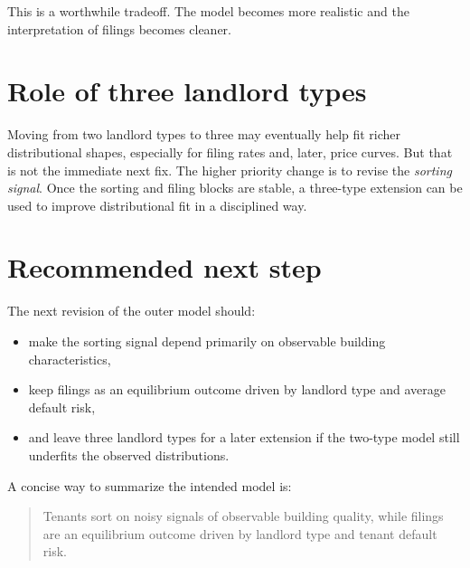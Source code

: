 \documentclass[11pt]{article}
\begin{document}
This is a worthwhile tradeoff. The model becomes more realistic and the interpretation of filings becomes cleaner.

\section{Role of three landlord types}
Moving from two landlord types to three may eventually help fit richer distributional shapes, especially for filing rates and, later, price curves. But that is not the immediate next fix. The higher priority change is to revise the \emph{sorting signal}. Once the sorting and filing blocks are stable, a three-type extension can be used to improve distributional fit in a disciplined way.

\section{Recommended next step}
The next revision of the outer model should:
\begin{itemize}
    \item make the sorting signal depend primarily on observable building characteristics,
    \item keep filings as an equilibrium outcome driven by landlord type and average default risk,
    \item and leave three landlord types for a later extension if the two-type model still underfits the observed distributions.
\end{itemize}

A concise way to summarize the intended model is:
\begin{quote}
Tenants sort on noisy signals of observable building quality, while filings are an equilibrium outcome driven by landlord type and tenant default risk.
\end{quote}
\end{document}
